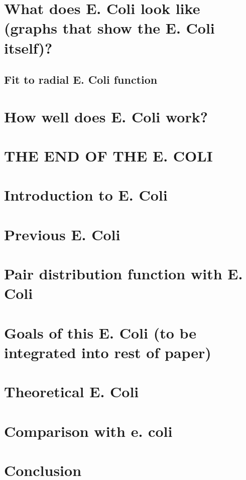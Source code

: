 \documentclass[letterpaper,twocolumn,amsmath,amssymb,pre]{revtex4-1}
\begin{document}
\section{What does E. Coli look like (graphs that show the E. Coli itself)?}
\subsection{Fit to radial E. Coli function}

\section{How well does E. Coli work?}

\section{THE END OF THE E. COLI}

\section{Introduction to E. Coli}

\section{Previous E. Coli}

\section{Pair distribution function with E. Coli}

\section{Goals of this E. Coli (to be integrated into rest of paper)}

\section{Theoretical E. Coli}

\section{Comparison with e. coli}\label{sec:comparison}

\section{Conclusion}
\end{document}
